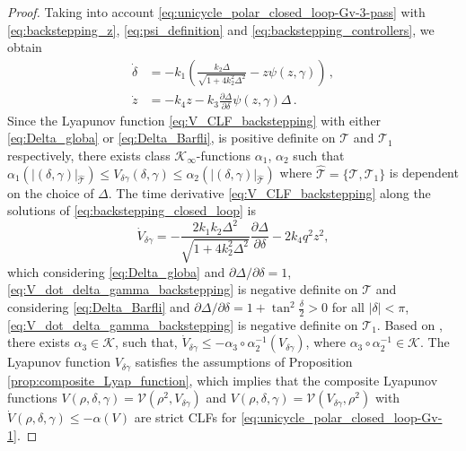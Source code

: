 \documentclass[letterpaper, 10 pt, conference]{ieeeconf}  %
\newcommand{\abs}[1]{\left\lvert#1\right\rvert}
\begin{document}
\begin{proof}
Taking into account \eqref{eq:unicycle_polar_closed_loop-Gv-3-pass} with \eqref{eq:backstepping_z}, \eqref{eq:psi_definition} and \eqref{eq:backstepping_controllers},  
we obtain
\begin{subequations}
\begin{align}
\dot{\delta} &= - k_1 \left( \frac{k_2 \Delta}{\sqrt{1+4k_2^2\Delta^2}}
- z \psi(z,\gamma) \right) \,, \label{eq:delta_globa} \\
\dot{z} &=  -k_4 z -k_3 \frac{\partial \Delta}{\partial \delta} \psi(z,\gamma) \Delta \,.  \label{eq:z_globa}
\end{align}
\label{eq:backstepping_closed_loop}
\end{subequations}
Since the Lyapunov function \eqref{eq:V_CLF_backstepping} with either \eqref{eq:Delta_globa} or \eqref{eq:Delta_Barfli}, is positive definite on $\mathcal{T}$ and $\mathcal{T}_1$ respectively, there exists class $\mathcal{K}_{\infty}$-functions $\alpha_1$, $\alpha_2$ such that $\alpha_1(\abs{(\delta,\gamma)}_{\hat{\mathcal{T}}}) \le V_{\delta \gamma }(\delta, \gamma) \le \alpha_2(\abs{(\delta,\gamma)}_{\hat{\mathcal{T}}})$ where $\hat{\mathcal{T}} = \{\mathcal{T}, \mathcal{T}_1\}$ is dependent on the choice of $\Delta$.
The time derivative \eqref{eq:V_CLF_backstepping} along the solutions of \eqref{eq:backstepping_closed_loop} is  
\begin{equation}
    \dot{V}_{\delta \gamma} = -\frac{2k_1k_2 \Delta^2}{\sqrt{1+4k_2^2 \Delta^2}} \frac{\partial \Delta}{\partial \delta} - 2k_4 q^2 z^2, \label{eq:V_dot_delta_gamma_backstepping}
\end{equation}
which considering \eqref{eq:Delta_globa} and $\partial \Delta / \partial \delta = 1$, \eqref{eq:V_dot_delta_gamma_backstepping} is negative definite on $\mathcal{T}$ and considering \eqref{eq:Delta_Barfli} and $\partial \Delta / \partial \delta = 1 + \tan^2 \frac{\delta}{2} >0$  for all $|\delta| < \pi $, \eqref{eq:V_dot_delta_gamma_backstepping} is negative definite on $\mathcal{T}_1$.
Based on \cite[Lemma 4.3]{khalil_nonlinear_2002},  
there exists 
$\alpha_3\in\mathcal{K}$, such that, $\dot{V}_{\delta \gamma} \le - \alpha_3 \circ \alpha_2^{-1}
(V_{\delta \gamma})$, where $%
\alpha_3 \circ \alpha_2^{-1}\in\mathcal{K}$. 
The Lyapunov function $V_{\delta \gamma}$ satisfies the assumptions of Proposition \ref{prop:composite_Lyap_function}, which implies that the composite Lyapunov functions $V(\rho, \delta, \gamma) = \mathcal{V}(\rho^2, V_{\delta \gamma})$ and $V(\rho, \delta, \gamma) = \mathcal{V}(V_{\delta \gamma},\rho^2)$ with  $\dot{V}(\rho,\delta,\gamma) \le - \alpha(V)$ are strict CLFs for \eqref{eq:unicycle_polar_closed_loop-Gv-1}. 

\end{proof}
\end{document}
